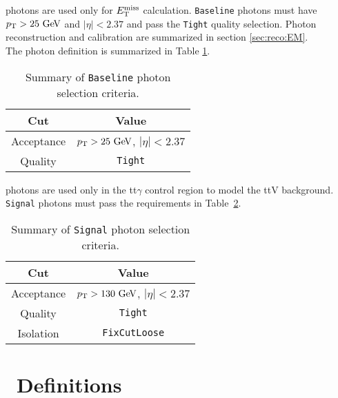  photons are used only for $E_{\mathrm{T}}^{\mathrm{miss}}$ calculation.  {\tt Baseline} photons must have $\pt > 25 \gev$ and $|\eta| < 2.37$ and pass the {\tt Tight} quality selection.  Photon reconstruction and calibration are summarized in section \ref{sec:reco:EM}. \\

\indent The photon definition is summarized in Table \ref{tb:photons:baseline}. \\

\begin{table}[h!]
  \caption{Summary of {\tt Baseline} photon selection criteria.} 
  \label{tb:photons:baseline}
  \begin{center}
    \begin{tabular}{c|c} \hline \hline
      Cut & Value \\ \hline \hline
      Acceptance & $\pT > 25 \gev$, $|\eta| < 2.37$ \\ \hline
      Quality & {\tt Tight} \\ \hline
      \hline
    \end{tabular}
  \end{center}
\end{table}%

 photons are used only in the tt$\gamma$ control region to model the ttV background.  {\tt Signal} photons must pass the requirements in Table~\ref{tb:photons}.  \\%

\begin{table}[h!]
  \caption{Summary of {\tt Signal} photon selection criteria.} 
  \label{tb:photons}
  \begin{center}
    \begin{tabular}{c|c} \hline \hline
      Cut & Value \\ \hline \hline
      Acceptance & $\pT > 130 \gev$, $|\eta| < 2.37$ \\ \hline
      Quality & {\tt Tight} \\ \hline
      Isolation &  {\tt FixCutLoose} \\ \hline
      \hline
    \end{tabular}
  \end{center}
\end{table}%

\section{\met\ Definitions} 
\label{sec:Selection_MET}

